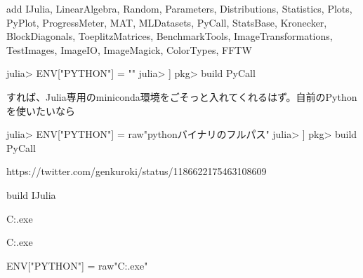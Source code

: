 add IJulia, LinearAlgebra, Random, Parameters, Distributions, Statistics, Plots, PyPlot, ProgressMeter, MAT, MLDatasets, PyCall, StatsBase, Kronecker, BlockDiagonals, ToeplitzMatrices, BenchmarkTools, ImageTransformations, TestImages, ImageIO, ImageMagick, ColorTypes, FFTW


julia> ENV["PYTHON"] = ""
julia> ]
pkg> build PyCall


すれば、Julia専用のminiconda環境をごそっと入れてくれるはず。自前のPythonを使いたいなら

julia> ENV["PYTHON"] = raw"pythonバイナリのフルパス"
julia> ]
pkg> build PyCall

https://twitter.com/genkuroki/status/1186622175463108609

build IJulia

C:\Users\yamta\AppData\Local\Programs\Python{}\python.exe

C:\Users\yamtak\AppData\Local\Programs\Python{}\python.exe

ENV["PYTHON"] = raw"C:\Users\yamtak\AppData\Local\Programs\Python{}\python.exe"